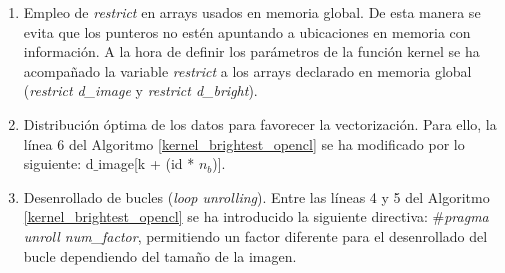 \begin{enumerate}
\item Empleo de \textit{restrict} en arrays usados en memoria global. De esta manera se evita que los punteros no estén apuntando a ubicaciones en memoria con información. A la hora de definir los parámetros de la función kernel se ha acompañado la variable \textit{restrict} a los arrays declarado en memoria global (\textit{restrict d\_image} y \textit{restrict d\_bright}).
\item Distribución óptima de los datos para favorecer la vectorización. Para ello, la línea 6 del Algoritmo \ref{kernel_brightest_opencl} se ha modificado por lo siguiente: d$\_$image[k + (id * $n_{b}$)].
\item Desenrollado de bucles (\textit{loop unrolling}). Entre las líneas 4 y 5 del Algoritmo \ref{kernel_brightest_opencl} se ha introducido la siguiente directiva: \#\textit{pragma unroll num\_factor}, permitiendo un factor diferente para el desenrollado del bucle dependiendo del tamaño de la imagen. 
\end{enumerate}

